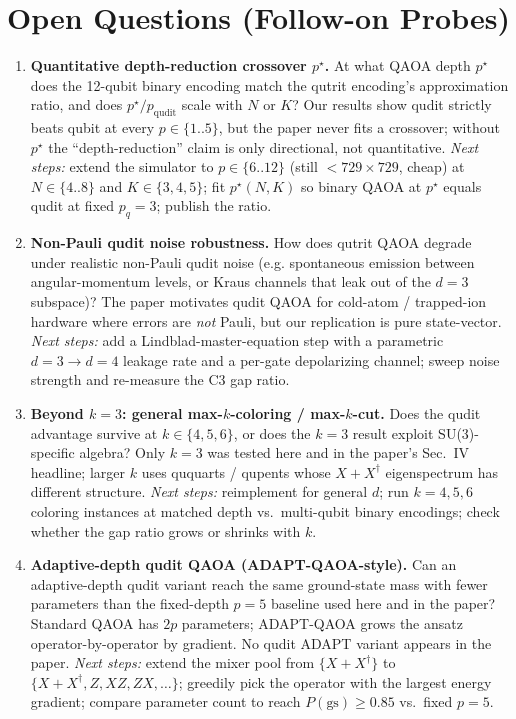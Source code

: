 \section{Open Questions (Follow-on Probes)}

\begin{enumerate}
\item \textbf{Quantitative depth-reduction crossover $p^\star$.}
At what QAOA depth $p^\star$ does the 12-qubit binary encoding match
the qutrit encoding's approximation ratio, and does $p^\star/p_{\text{qudit}}$
scale with $N$ or $K$? Our results show qudit strictly beats qubit at
every $p\in\{1..5\}$, but the paper never fits a crossover; without
$p^\star$ the ``depth-reduction'' claim is only directional, not
quantitative. \emph{Next steps:} extend the simulator to $p\in\{6..12\}$
(still $<729{\times}729$, cheap) at $N\in\{4..8\}$ and $K\in\{3,4,5\}$;
fit $p^\star(N,K)$ so binary QAOA at $p^\star$ equals qudit at fixed
$p_q{=}3$; publish the ratio.

\item \textbf{Non-Pauli qudit noise robustness.}
How does qutrit QAOA degrade under realistic non-Pauli qudit noise
(e.g. spontaneous emission between angular-momentum levels, or Kraus
channels that leak out of the $d{=}3$ subspace)? The paper motivates
qudit QAOA for cold-atom / trapped-ion hardware where errors are
\emph{not} Pauli, but our replication is pure state-vector.
\emph{Next steps:} add a Lindblad-master-equation step with a
parametric $d{=}3\to d{=}4$ leakage rate and a per-gate depolarizing
channel; sweep noise strength and re-measure the C3 gap ratio.

\item \textbf{Beyond $k=3$: general max-$k$-coloring / max-$k$-cut.}
Does the qudit advantage survive at $k\in\{4,5,6\}$, or does the
$k=3$ result exploit SU(3)-specific algebra? Only $k=3$ was tested
here and in the paper's Sec.~IV headline; larger $k$ uses ququarts /
qupents whose $X+X^\dagger$ eigenspectrum has different structure.
\emph{Next steps:} reimplement for general $d$; run $k=4,5,6$ coloring
instances at matched depth vs.\ multi-qubit binary encodings; check
whether the gap ratio grows or shrinks with $k$.

\item \textbf{Adaptive-depth qudit QAOA (ADAPT-QAOA-style).}
Can an adaptive-depth qudit variant reach the same ground-state mass
with fewer parameters than the fixed-depth $p{=}5$ baseline used here
and in the paper? Standard QAOA has $2p$ parameters; ADAPT-QAOA grows
the ansatz operator-by-operator by gradient. No qudit ADAPT variant
appears in the paper. \emph{Next steps:} extend the mixer pool from
$\{X+X^\dagger\}$ to $\{X+X^\dagger, Z, XZ, ZX, \dots\}$; greedily
pick the operator with the largest energy gradient; compare parameter
count to reach $P(\text{gs})\ge 0.85$ vs.\ fixed $p{=}5$.


\end{enumerate}
